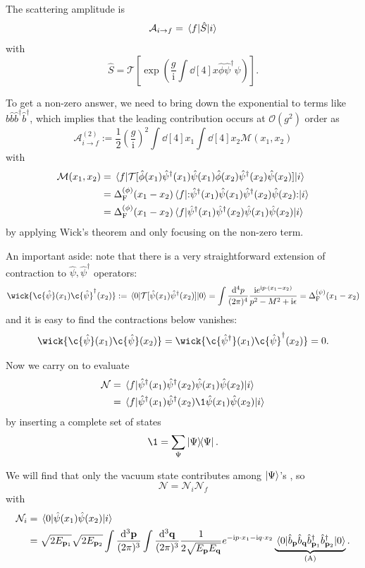 \documentclass[a4paper,11pt]{article}
\begin{document}
	The scattering amplitude is
	\[
		\mathcal{A}_{i \to f} = \mel{f}{\hat S}{i}
	\]
	with
	\[
		\hat S = \mathcal{T}\left[ \exp(\frac{g}{\mathrm{i}}\int \dd[4]{x} \hat \phi \hat \psi^{\dagger}\hat \psi) \right].
	\]
	
	To get a non-zero answer, we need to bring down the exponential to terms like $\hat b \hat b \hat b^{\dagger} \hat b^{\dagger}$, which implies that the leading contribution occurs at $\mathcal{O}(g^2)$ order as 
	\[
		\mathcal{A}_{i \to f}^{(2)} := \frac{1}{2} \left( \frac{g}{\mathrm{i}} \right)^2 \int \dd[4]{x_1} \int \dd[4]{x_2} \mathcal{M}(x_1,x_2)
	\]
	with
	\begin{align*}
		\mathcal{M}(x_1,x_2) & = \mel{f}{\mathcal{T}[\hat \phi(x_1) \hat \psi^{\dagger}(x_1) \hat \psi(x_1)\hat \phi(x_2) \hat \psi^{\dagger}(x_2) \hat \psi(x_2)]}{i}\\
		& = \Delta_\text{F}^{(\phi)}(x_1 - x_2) \mel{f}{:\mathrel{\hat \psi^{\dagger}(x_1)\hat \psi(x_1)\hat \psi^{\dagger}(x_2)\hat \psi(x_2)}:}{i}\\
		& = \Delta_\text{F}^{(\phi)}(x_1 - x_2) \mel{f}{\hat \psi^{\dagger}(x_1) \hat \psi^{\dagger}(x_2) \hat \psi(x_1)\hat \psi(x_2)}{i}
	\end{align*}
	by applying Wick's theorem and only focusing on the non-zero term.

	An important aside: note that there is a very straightforward extension of contraction to $\hat \psi, \hat \psi^{\dagger}$ operators: 
	\[
		\wick{\c{\hat \psi}(x_1)\c{\hat \psi}^{\dagger}(x_2)}:= \mel{0}{\mathcal{T}[\hat \psi(x_1)\hat \psi^{\dagger}(x_2)]}{0} = \int \ddk{p}{4} \frac{\mathrm{i} e ^{\mathrm{i} p \cdot (x_1 - x_2)}}{p^2 - M^2 + \mathrm{i} \epsilon} = \Delta_\text{F}^{(\psi)}(x_1 - x_2)
	\]
	and it is easy to find the contractions below vanishes:
	\[
		\wick{\c{\hat \psi}(x_1)\c{\hat \psi}(x_2)} = \wick{\c{\hat \psi^{\dagger}}(x_1) \c{\hat \psi}^{\dagger}(x_2)} = 0.
	\]

	Now we carry on to evaluate
	\begin{align*}
		\mathcal{N} & = \mel{f}{\hat \psi^{\dagger}(x_1)\hat \psi^{\dagger}(x_2) \hat \psi(x_1) \hat \psi(x_2)}{i}\\
		& = \mel{f}{\hat \psi^{\dagger}(x_1)\hat \psi^{\dagger}(x_2) \1 \hat \psi(x_1) \hat \psi(x_2)}{i}
	\end{align*}
	by inserting a complete set of states
	\[
		\1 = \sum _{\Psi} \dyad{\Psi}{\Psi}.
	\]

	We will find that only the vacuum state contributes among $\ket{\Psi}$'s , so
	\[
		\mathcal{N} = \mathcal{N}_i \mathcal{N}_f
	\]
	with
	\begin{align*}
		\mathcal{N}_i & = \mel{0}{\hat \psi(x_1)\hat \psi(x_2)}{i}\\
		& = \sqrt{2 E _{\vb p_1}} \sqrt{2 E _{\vb p_2}} \int \frac{\dd[3]{\vb p}}{(2\pi)^{3}} \int \frac{\dd[3]{\vb q}}{(2\pi)^{3}} \frac{1}{2 \sqrt{E _{\vb p} E _{\vb q}}} e ^{-\mathrm{i} p \cdot x_1 - \mathrm{i} q \cdot x_2} \underbrace{\mel{0}{\hat b _{\vb p} \hat b _{\vb q} \hat b^{\dagger}_{\vb p_1}\hat b^{\dagger}_{\vb p_2}}{0}}_{\text{(A)}}.
	\end{align*}
\end{document}
